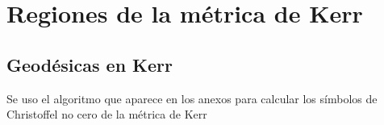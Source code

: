 \section{Regiones de la métrica de Kerr}



\subsection{Geodésicas en Kerr}
Se uso el algoritmo que aparece en los anexos para calcular los símbolos de Christoffel no cero de la métrica de Kerr

